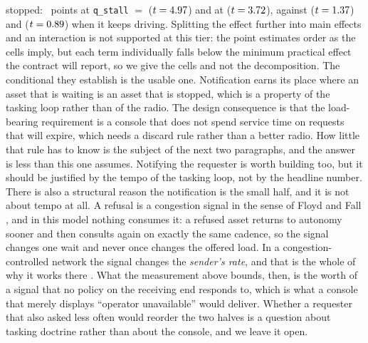 \documentclass[11pt]{article}
\begin{document}
stopped: \qFacStopPub{}~points at \texttt{q\_stall} $=$ \qStallPub{} ($t = 4.97{}$) and \qFacStopFree{} at \qStallFree{} ($t = 3.72{}$), against \qFacGoPub{} ($t = 1.37{}$) and \qFacGoFree{} ($t = 0.89{}$) when it keeps driving. Splitting the effect further into main effects and an interaction is not supported at this tier: the point estimates order as the cells imply, but each term individually falls below the minimum practical effect the contract will report, so we give the cells and not the decomposition. The conditional they establish is the usable one. Notification earns its place where an asset that is waiting is an asset that is stopped, which is a property of the tasking loop rather than of the radio. The design consequence is that the load-bearing requirement is a console that does not spend service time on requests that will expire, which needs a discard rule rather than a better radio. How little that rule has to know is the subject of the next two paragraphs, and the answer is less than this one assumes. Notifying the requester is worth building too, but it should be justified by the tempo of the tasking loop, not by the headline number. There is also a structural reason the notification is the small half, and it is not about tempo at all. A refusal is a congestion signal in the sense of Floyd and Fall \citep{floyd1999congestion}, and in this model nothing consumes it: a refused asset returns to autonomy sooner and then consults again on exactly the same cadence, so the signal changes one wait and never once changes the offered load. In a congestion-controlled network the signal changes the \emph{sender's rate}, and that is the whole of why it works there \citep{jacobson1988congestion}. What the measurement above bounds, then, is the worth of a signal that no policy on the receiving end responds to, which is what a console that merely displays ``operator unavailable'' would deliver. Whether a requester that also asked less often would reorder the two halves is a question about tasking doctrine rather than about the console, and we leave it open.
\end{document}
